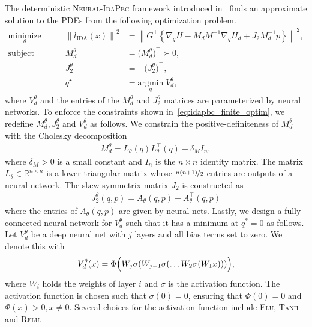 The deterministic \textsc{Neural-IdaPbc} framework introduced
in~\cite{neuralidapbc} finds an approximate solution to the PDEs from the
following optimization problem.
\begin{equation}
  \begin{aligned}
      \underset{\theta }{\textrm{minimize}} 
      &&\quad \left\| l_{\textrm{IDA}} (x) \right\|^2 &= \left\| G^\perp \left\{ \nabla_qH - M_dM^{-1} \nabla_qH_d + J_2M_d^{-1}p \right\} \right\|^2, \\
      \textrm{subject to} 
      &&\quad M_d^\theta &= \big( M_d^\theta \big)^\top \succ 0, \\
      &&\quad J_2^\theta &= -\big( J_2^\theta \big)^\top, \\
      &&\quad q^\star &= \underset{q}{\textrm{argmin}}\; V_d^\theta,
  \end{aligned}    
  \label{eq:idapbc_finite_optim}%
\end{equation}
where $V^\theta_d$ and the entries of the $M^\theta_d$ and $J^\theta_2$ matrices
are parameterized by neural networks. 
%
To enforce the constraints shown in~\eqref{eq:idapbc_finite_optim}, we redefine
$M^\theta_d, J^\theta_2$ and $V^\theta_d$ as follows.
%
We constrain the positive-definiteness of $M^\theta_d$ with the Cholesky
decomposition 
\begin{align*}
  M^\theta_d = L_{\theta}(q)L_{\theta}^\top(q) + \delta_M I_n,
\end{align*}
\noindent where $\delta_M > 0$ is a small constant and $I_n$ is the $n \times n$
identity matrix.
%
The matrix $L_{\theta} \in \mathbb{R}^{n \times n}$ is a lower-triangular matrix
whose $\nicefrac{n(n+1)}{2}$ entries are outputs of a neural network. 
%
The skew-symmetrix matrix $J_2$ is constructed as 
\begin{align*}
  J_2^\theta(q, p) = A_\theta(q, p) - A^\top_\theta(q, p)
\end{align*}
\noindent where the entries of $A_{\theta}(q, p)$ are given by neural nets.
%
Lastly, we design a fully-connected neural network for $V^\theta_d$ such that it
has a minimum at $q^*=0$ as follows.
%
Let $V^\theta_d$ be a deep neural net with $j$ layers and all bias terms set to
zero. We denote this with
\begin{equation}
  V_d^\theta(x) = \Phi \Bigl( W_j\sigma(W_{j-1}\sigma(\ldots W_2\sigma(W_1x))) \Bigr),
  \label{eq:Vdnet_constraint}
\end{equation}
\noindent where $W_i$ holds the weights of layer $i$ and $\sigma$ is the activation function.
%
The activation function is chosen such that $\sigma(0) = 0$, ensuring that
$\Phi(0) = 0$ and $\Phi(x) > 0, x \ne 0$.
%
Several choices for the activation function include \textsc{Elu}, \textsc{Tanh} and \textsc{Relu}.
%


